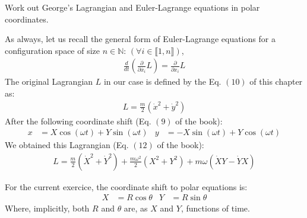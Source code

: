\documentclass[solutions.tex]{subfiles}
\begin{document}
\maketitle
\begin{exercise}
Work out George's Lagrangian and Euler-Lagrange equations
in polar coordinates.
\end{exercise}
As always, let us recall the general form of Euler-Lagrange equations
for a configuration space of size $n\in\mathbb{N}$:
$(\forall i \in\llbracket 1, n\rrbracket)$,
\begin{align}
	\frac{d}{dt}\left(\frac{\partial}{\partial\dot{x_i}}L\right)
		= \frac{\partial}{\partial x_i}L
	\label{eqn:l06e04:euler-lagrange}
\end{align}
The original Lagrangian $L$ in our case is defined by the Eq. $(10)$
of this chapter as:
\begin{align}
	L = \frac{m}{2}\left(\dot{x}^2+\dot{y}^2\right)
	\label{eqn:l06e04:lagrangian}
\end{align}
After the following coordinate shift (Eq. $(9)$ of the book):
\begin{align}
	x &= X\cos(\omega t) + Y\sin(\omega t)& y &= -X \sin(\omega t)+Y\cos(\omega t)
	\label{eqn:l06e04-1st-shift}
\end{align}
We obtained this Lagrangian (Eq. $(12)$ of the book):
\begin{align}
	L = \frac{m}{2}(\dot{X}^2+\dot{Y}^2)
	  + \frac{m\omega^2}{2}(X^2+Y^2)
	  + m\omega(\dot{X}Y-\dot{Y}X)
	\label{eqn:l06e04:lagrangian-1st-shift}
\end{align}

For the current exercice, the coordinate shift to polar equations is:
\begin{align}
	X &= R \cos\theta & Y &= R \sin\theta
	\label{eqn:l06e04:coordinate-shift}
\end{align}
Where, implicitly, both $R$ and $\theta$ are, as $X$ and $Y$, functions of
time. \\
\end{document}

